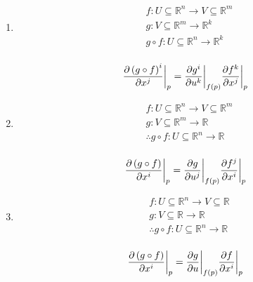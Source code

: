 \begin{enumerate}
    \item
    \begin{align*}
        & f: U \subseteq \mathbb{R}^n \longrightarrow V \subseteq \mathbb{R}^m \\
        & g: V \subseteq \mathbb{R}^m \longrightarrow \mathbb{R}^k \\
        & g \circ f : U \subseteq \mathbb{R}^n \longrightarrow \mathbb{R}^k \\
    \end{align*}

    \begin{align*}
        & \frac{\partial \left(  g \circ f \right)^i}{\partial x^j} \bigg|_p = \frac{\partial g^i}{\partial u^k} \bigg|_{f(p)} \frac{\partial f^k}{\partial x^j} \bigg|_p \\
    \end{align*}

    \item
    \begin{align*}
        & f: U \subseteq \mathbb{R}^n \longrightarrow V \subseteq \mathbb{R}^m \\
        & g: V \subseteq \mathbb{R}^m \longrightarrow \mathbb{R} \\
        & \therefore g \circ f : U \subseteq \mathbb{R}^n \longrightarrow \mathbb{R} \\
    \end{align*}

    \begin{align*}
        & \frac{\partial \left(  g \circ f \right)}{\partial x^i} \bigg|_p = \frac{\partial g}{\partial u^j} \bigg|_{f(p)} \frac{\partial f^j}{\partial x^i} \bigg|_p \\
    \end{align*}

    \item
    \begin{align*}
        & f: U \subseteq \mathbb{R}^n \longrightarrow V \subseteq \mathbb{R} \\
        & g: V \subseteq \mathbb{R} \longrightarrow \mathbb{R} \\
        & \therefore g \circ f : U \subseteq \mathbb{R}^n \longrightarrow \mathbb{R} \\
    \end{align*}

    \begin{align*}
        & \frac{\partial \left(  g \circ f \right)}{\partial x^i} \bigg|_p = \frac{\partial g}{\partial u} \bigg|_{f(p)} \frac{\partial f}{\partial x^i} \bigg|_p \\
    \end{align*}


\end{enumerate}
